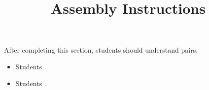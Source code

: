 \documentclass{ximera}
\title{Assembly Instructions}
\begin{document}
\begin{abstract}
\end{abstract}

\maketitle

\begin{sectionOutcomes}

After completing this section, students should understand pairs. 

\begin{itemize}
\item Students .
\item Students .
\end{itemize}

\end{sectionOutcomes}
\end{document}
